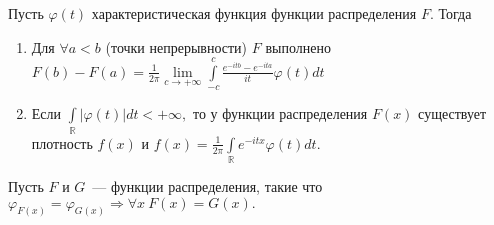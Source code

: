 	\begin{theorem}
		Пусть $\varphi(t)$ характеристическая функция функции распределения $F$. Тогда
		\begin{enumerate}
			\item Для $\forall a < b$ (точки непрерывности) $F$ выполнено
			$F(b) - F(a) = \frac{1}{2\pi} \lim\limits_{c \to +\infty} \int\limits_{-c}^{c} \frac{e^{-itb} - e^{-ita}}{it}\varphi(t)dt$
			\item Если $\int\limits_\mathbb{R}|\varphi(t)|dt < +\infty,$ то у функции распределения $F(x)$ существует плотность $f(x)$ и $f(x) = \frac{1}{2\pi}\int\limits_\mathbb{R} e^{-itx}\varphi(t)dt.$
		\end{enumerate}
	\end{theorem}
	
	\begin{theorem}[единственности]
		Пусть \(F\) и \(G\)~--- функции распределения, такие что \(\varphi_{F(x)} = \varphi_{G(x)} \Rightarrow \forall x~F(x) = G(x).\)
	\end{theorem}

